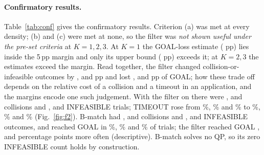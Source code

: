 \documentclass[11pt]{article}
\begin{document}
\paragraph{Confirmatory results.} Table~\ref{tab:conf} gives the confirmatory results. Criterion (a)
was met at every density; (b) and (c) were met at none, so the filter was \emph{not shown useful under
the pre-set criteria} at $K=1,2,3$. At $K=1$ the GOAL-loss estimate (\Blossone{} pp) lies inside the
5\,pp margin and only its upper bound (\Bupperone{} pp) exceeds it; at $K=2,3$ the estimates exceed the
margin. Read together, the filter changed collision-or-infeasible outcomes by \Adiffone, \Adifftwo{}
and \Adiffthree{} pp and lost \Blossone, \Blosstwo{} and \Blossthree{} pp of GOAL; how these trade off
depends on the relative cost of a collision and a timeout in an application, and the margins encode one
such judgement. With the filter on there were \CollOnone, \CollOntwo{} and
\CollOnthree{} collisions and \InfOnone, \InfOntwo{} and \InfOnthree{} INFEASIBLE trials;
TIMEOUT rose from \TOoffone\%, \TOofftwo\% and \TOoffthree\% to \TOonone\%, \TOontwo\% and
\TOonthree\% (Fig.~\ref{fig:f2}). B-match had \CollBmone, \CollBmtwo{} and \CollBmthree{} collisions
and \InfBmone, \InfBmtwo{} and \InfBmthree{} INFEASIBLE outcomes, and reached GOAL in \GoalBmone\%,
\GoalBmtwo\% and \GoalBmthree\% of trials; the filter reached GOAL \OnMinusBmGoalone,
\OnMinusBmGoaltwo{} and \OnMinusBmGoalthree{} percentage points more often (descriptive). B-match
solves no QP, so its zero INFEASIBLE count holds by construction.
\end{document}
